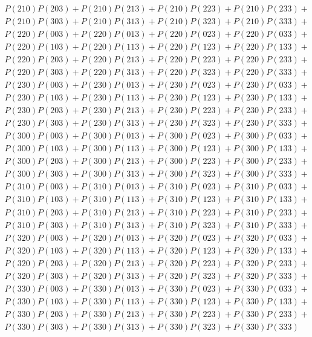 \documentclass{article}
\begin{document}
\begin{gather*}
        P(210)P(203) + P(210)P(213) + P(210)P(223) + P(210)P(233) + \\
        P(210)P(303) + P(210)P(313) + P(210)P(323) + P(210)P(333) + \\
        P(220)P(003) + P(220)P(013) + P(220)P(023) + P(220)P(033) + \\
        P(220)P(103) + P(220)P(113) + P(220)P(123) + P(220)P(133) + \\
        P(220)P(203) + P(220)P(213) + P(220)P(223) + P(220)P(233) + \\
        P(220)P(303) + P(220)P(313) + P(220)P(323) + P(220)P(333) + \\
        P(230)P(003) + P(230)P(013) + P(230)P(023) + P(230)P(033) + \\
        P(230)P(103) + P(230)P(113) + P(230)P(123) + P(230)P(133) + \\
        P(230)P(203) + P(230)P(213) + P(230)P(223) + P(230)P(233) + \\
        P(230)P(303) + P(230)P(313) + P(230)P(323) + P(230)P(333) + \\
        P(300)P(003) + P(300)P(013) + P(300)P(023) + P(300)P(033) + \\
        P(300)P(103) + P(300)P(113) + P(300)P(123) + P(300)P(133) + \\
        P(300)P(203) + P(300)P(213) + P(300)P(223) + P(300)P(233) + \\
        P(300)P(303) + P(300)P(313) + P(300)P(323) + P(300)P(333) + \\
        P(310)P(003) + P(310)P(013) + P(310)P(023) + P(310)P(033) + \\
        P(310)P(103) + P(310)P(113) + P(310)P(123) + P(310)P(133) + \\
        P(310)P(203) + P(310)P(213) + P(310)P(223) + P(310)P(233) + \\
        P(310)P(303) + P(310)P(313) + P(310)P(323) + P(310)P(333) + \\
        P(320)P(003) + P(320)P(013) + P(320)P(023) + P(320)P(033) + \\
        P(320)P(103) + P(320)P(113) + P(320)P(123) + P(320)P(133) + \\
        P(320)P(203) + P(320)P(213) + P(320)P(223) + P(320)P(233) + \\
        P(320)P(303) + P(320)P(313) + P(320)P(323) + P(320)P(333) + \\
        P(330)P(003) + P(330)P(013) + P(330)P(023) + P(330)P(033) + \\
        P(330)P(103) + P(330)P(113) + P(330)P(123) + P(330)P(133) + \\
        P(330)P(203) + P(330)P(213) + P(330)P(223) + P(330)P(233) + \\
        P(330)P(303) + P(330)P(313) + P(330)P(323) + P(330)P(333)
    \end{gather*}
\end{document}
